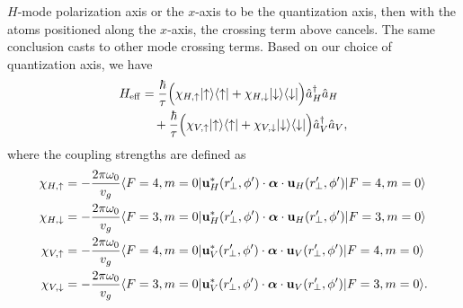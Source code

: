 \documentclass[preprint,aps,pra,onecolumn]{revtex4-1} %
\renewcommand{\tensor}[1]{\boldsymbol{#1}}
\begin{document}
$H$-mode polarization axis or the $x$-axis to be the quantization axis, then with the atoms positioned 
along the $x$-axis, the crossing term above cancels. The same conclusion casts to other mode crossing 
terms. 
Based on our choice of quantization axis, we have
\begin{align}
H_{\rm eff} & = \frac{ \hbar }{ \tau}\Big( \chi_{H,\uparrow}\lvert{\uparrow}\rangle\langle{\uparrow}\rvert +  
\chi_{H,\downarrow} \lvert{\downarrow}\rangle\langle{\downarrow}\rvert \Big) \hat{a}_H^\dagger \hat{a}_H \nonumber\\
&\quad +  \frac{ \hbar }{ \tau} \Big( \chi_{V,\uparrow}\lvert{\uparrow}\rangle\langle{\uparrow}\rvert +  \chi_{V,\downarrow} 
\lvert{\downarrow}\rangle\langle{\downarrow}\rvert \Big) \hat{a}_V^\dagger \hat{a}_V  ,
\end{align}
where the coupling strengths are defined as
\begin{align}
\chi_{H,\uparrow} &=  -\frac{2\pi\omega_0}{v_g} \bra{F=4,m=0} 
\mathbf{u}^*_{H}(r^\prime\!\!_\perp,\phi') \cdot\tensor{\alpha}\cdot 
\mathbf{u}_{H}(r^\prime\!\!_\perp,\phi') \ket{F=4,m=0}\\
\chi_{H,\downarrow} &=  -\frac{2\pi\omega_0}{v_g}  \bra{F=3,m=0} 
\mathbf{u}^*_{H}(r^\prime\!\!_\perp,\phi') \cdot\tensor{\alpha}\cdot 
\mathbf{u}_{H}(r^\prime\!\!_\perp,\phi') \ket{F=3,m=0} \\
\chi_{V,\uparrow} &=  -\frac{2\pi\omega_0}{v_g}   \bra{F=4,m=0} 
\mathbf{u}^*_{V}(r^\prime\!\!_\perp,\phi') \cdot\tensor{\alpha}\cdot 
\mathbf{u}_{V}(r^\prime\!\!_\perp,\phi') \ket{F=4,m=0}  \\
\chi_{V,\downarrow} &=  -\frac{2\pi\omega_0}{v_g}  \bra{F=3,m=0} 
\mathbf{u}^*_{V}(r^\prime\!\!_\perp,\phi') \cdot\tensor{\alpha}\cdot 
\mathbf{u}_{V}(r^\prime\!\!_\perp,\phi') \ket{F=3,m=0}. 
\end{align}
\end{document}
